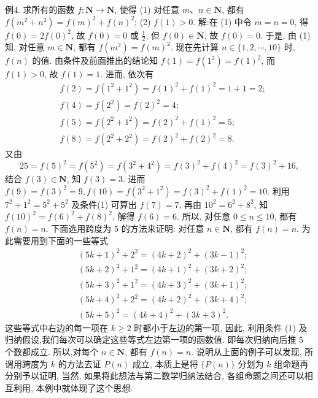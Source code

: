 例4. 求所有的函数 $f: \mathbf{N} \rightarrow \mathbf{N}$, 使得
(1) 对任意 $m 、 n \in \mathbf{N}$, 都有 $f\left(m^2+n^2\right)=f(m)^2+f(n)^2$;
(2) $f(1)>0$.
解:在 (1) 中令 $m=n=0$, 得 $f(0)=2 f(0)^2$, 故 $f(0)=0$ 或 $\frac{1}{2}$, 但 $f(0) \in \mathbf{N}$, 故 $f(0)=0$. 于是, 由 (1) 知, 对任意 $m \in \mathbf{N}$, 都有 $f\left(m^2\right)=f(m)^2$. 现在先计算 $n \in\{1,2, \cdots, 10\}$ 时, $f(n)$ 的值.
由条件及前面推出的结论知 $f(1)=f\left(1^2\right)=f(1)^2$, 而 $f(1)>0$, 故 $f(1)=1$. 进而, 依次有
$$
\begin{aligned}
& f(2)=f\left(1^2+1^2\right)=f(1)^2+f(1)^2=1+1=2 ; \\
& f(4)=f\left(2^2\right)=f(2)^2=4 ; \\
& f(5)=f\left(2^2+1^2\right)=f(2)^2+f(1)^2=5 ; \\
& f(8)=f\left(2^2+2^2\right)=f(2)^2+f(2)^2=8 .
\end{aligned}
$$
又由
$$
25=f(5)^2=f\left(5^2\right)=f\left(3^2+4^2\right)=f(3)^2+f(4)^2=f(3)^2+16,
$$
结合 $f(3) \in \mathbf{N}$, 知 $f(3)=3$. 进而 $f(9)=f(3)^2=9, f(10)=f\left(3^2+1^2\right)= f(3)^2+f(1)^2=10$.
利用 $7^2+1^2=5^2+5^2$ 及条件(1) 可算出 $f(7)=7$, 再由 $10^2=6^2+8^2$, 知 $f(10)^2=f(6)^2+f(8)^2$, 解得 $f(6)=6$.
所以, 对任意 $0 \leqslant n \leqslant 10$, 都有 $f(n)=n$.
下面选用跨度为 5 的方法来证明: 对任意 $n \in \mathbf{N}$, 都有 $f(n)=n$.
为此需要用到下面的一些等式
$$
\begin{aligned}
& (5 k+1)^2+2^2=(4 k+2)^2+(3 k-1)^2 ; \\
& (5 k+2)^2+1^2=(4 k+1)^2+(3 k+2)^2 ; \\
& (5 k+3)^2+1^2=(4 k+3)^2+(3 k+1)^2 ; \\
& (5 k+4)^2+2^2=(4 k+2)^2+(3 k+4)^2 ; \\
& (5 k+5)^2=(4 k+4)^2+(3 k+3)^2 .
\end{aligned}
$$
这些等式中右边的每一项在 $k \geqslant 2$ 时都小于左边的第一项, 因此, 利用条件 (1) 及归纳假设,我们每次可以确定这些等式左边第一项的函数值.
即每次归纳向后推 5 个数都成立.
所以,对每个 $n \in \mathbf{N}$, 都有 $f(n)=n$.
说明从上面的例子可以发现, 所谓用跨度为 $k$ 的方法去证 $P(n)$ 成立, 本质上是将 $\{P(n)\}$ 分划为 $k$ 组命题再分别予以证明, 当然, 如果将此想法与第二数学归纳法结合, 各组命题之间还可以相互利用, 本例中就体现了这个思想.


